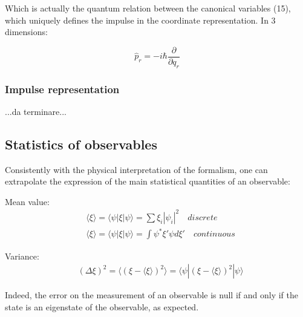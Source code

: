 \documentclass{article}
\begin{document}
Which is actually the quantum relation between the canonical variables (15),
which uniquely defines the impulse in the coordinate representation.
In 3 dimensions:

\begin{tcolorbox}[colframe=gray!50, colback=gray!10, coltitle=black, title=Coordinate representation of the impulse]
  \begin{equation}
    \hat{p}_r = -i\hbar \frac{\partial}{\partial q_r}
  \end{equation}
\end{tcolorbox}

\subsubsection{Impulse representation}

...da terminare...

\subsection{Statistics of observables}

Consistently with the physical interpretation of the formalism, one can extrapolate the
expression of the main statistical quantities of an observable:

\begin{tcolorbox}[colframe=gray!50, colback=gray!10, coltitle=black, title=Statistics of an observable]
  Mean value:
  \begin{equation}
    \begin{aligned}
       & \langle \xi\rangle = \langle \psi|\xi|\psi\rangle = \sum \xi_i |\psi_i|^2 \quad discrete       \\
       & \langle \xi\rangle = \langle \psi|\xi|\psi\rangle = \int \psi^*\xi'\psi d\xi' \quad continuous
    \end{aligned}
  \end{equation}

  Variance:
  \begin{equation}
    \begin{aligned}
       & (\Delta \xi)^2=\langle (\xi-\langle \xi\rangle )^2\rangle = \langle \psi|(\xi-\langle \xi\rangle )^2|\psi\rangle
    \end{aligned}
  \end{equation}
\end{tcolorbox}

Indeed, the error on the measurement of an observable is null if and only if the state is an eigenstate of the observable, as expected.
\end{document}
